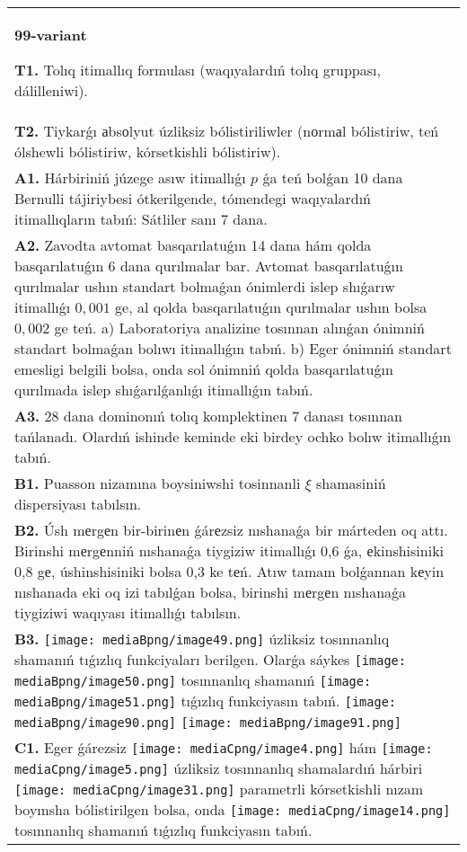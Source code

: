 \documentclass{article}
\begin{document}
\begin{tabular}{m{17cm}}
\textbf{99-variant}
\newline

\textbf{T1.} Tolıq itimallıq formulası (waqıyalardıń tolıq gruppası, dálilleniwi).
 \\
\textbf{T2.} Tiykarǵı аbsоlyut úzliksiz bólistiriliwler (nоrmаl bólistiriw, teń ólshewli bólistiriw, kórsetkishli bólistiriw). 
 \\
\textbf{A1.} 
Hárbiriniń júzege asıw itimallıǵı $p$ ǵa teń bolǵan 10 dana Bernulli tájiriybesi ótkerilgende, tómendegi waqıyalardıń itimallıqların tabıń: Sátliler sanı 7 dana.
 \\
\textbf{A2.} Zavodta avtomat basqarılatuǵın 14 dana hám qolda basqarılatuǵın 6 dana qurılmalar bar. Avtomat basqarılatuǵın qurılmalar ushın standart bolmaǵan ónimlerdi islep shıǵarıw itimallıǵı $0,001$ ge, al qolda basqarılatuǵın qurılmalar ushın bolsa $0,002$ ge teń. a) Laboratoriya analizine tosınnan alınǵan ónimniń standart bolmaǵan bolıwı itimallıǵın tabıń. b) Eger ónimniń standart emesligi belgili bolsa, onda sol ónimniń qolda basqarılatuǵın qurılmada islep shıǵarılǵanlıǵı itimallıǵın tabıń.
 \\
\textbf{A3.} 28 dana dominonıń tolıq komplektinen 7 danası tosınnan tańlanadı. Olardıń ishinde keminde eki birdey ochko bolıw itimallıǵın tabıń.
 \\
\textbf{B1.} Puasson nizamına boysiniwshi tosinnanli $\xi$ shamasiniń dispersiyası tabılsın.
 \\
\textbf{B2.} Úsh mеrgеn bir-birinеn ǵárеzsiz nıshanaǵa bir márteden oq attı. Birinshi mеrgеnniń nıshanaǵa tiygiziw itimallıǵı 0,6 ǵa, еkinshisiniki 0,8 gе, úshinshisiniki bolsa 0,3 ke tеń. Atıw tamam bolǵannan kеyin nıshanada eki oq izi tabılǵan bolsa, birinshi mеrgеn nıshanaǵa tiygiziwi waqıyası itimallıǵı tabılsın.
 \\
\textbf{B3.} \texttt{[image: mediaBpng/image49.png]} úzliksiz tosınnanlıq shamanıń tıǵızlıq funkciyaları berilgen. Olarǵa sáykes \texttt{[image: mediaBpng/image50.png]} tosınnanlıq shamanıń \texttt{[image: mediaBpng/image51.png]} tıǵızlıq funkciyasın tabıń. \texttt{[image: mediaBpng/image90.png]} \texttt{[image: mediaBpng/image91.png]}
 \\
\textbf{C1.} Eger ǵárezsiz \texttt{[image: mediaCpng/image4.png]} hám \texttt{[image: mediaCpng/image5.png]} úzliksiz tosınnanlıq shamalardıń hárbiri \texttt{[image: mediaCpng/image31.png]} parametrli kórsetkishli nızam boyınsha bólistirilgen bolsa, onda \texttt{[image: mediaCpng/image14.png]} tosınnanlıq shamanıń tıǵızlıq funkciyasın tabıń.

\end{tabular}
\end{document}
